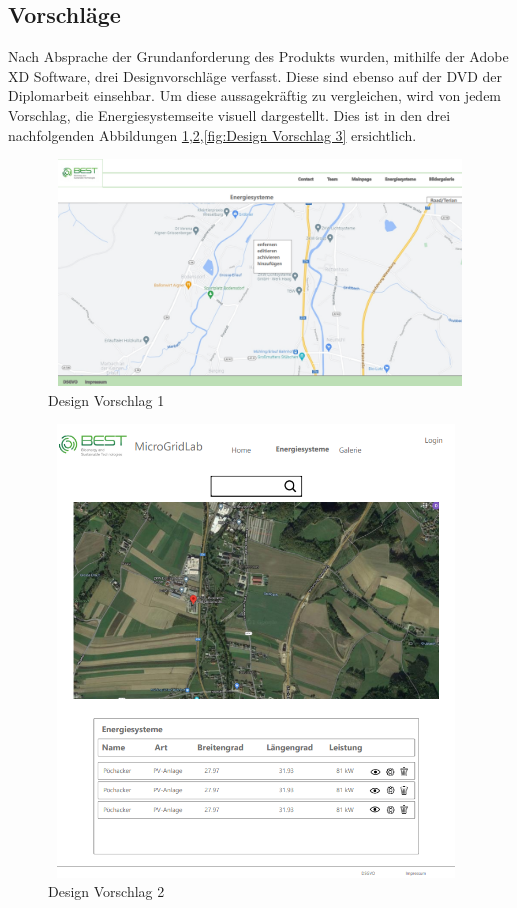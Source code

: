 \subsection{Vorschläge}
Nach Absprache der Grundanforderung des Produkts wurden, mithilfe der Adobe XD Software,  drei Designvorschläge verfasst. Diese sind ebenso auf der DVD der Diplomarbeit einsehbar. Um diese aussagekräftig zu vergleichen, wird von jedem Vorschlag, die Energiesystemseite visuell dargestellt. Dies ist in den drei nachfolgenden Abbildungen \ref{fig:Design Vorschlag 1},\space\ref{fig:Design Vorschlag 2},\space\ref{fig:Design Vorschlag 3} ersichtlich.
\begin{figure}[h]
	\centering
	\includegraphics[height=6cm,width=12cm]{images/DesignVorschlag1}
	\caption{Design Vorschlag 1}
	\label{fig:Design Vorschlag 1}
\end{figure}
\newpage
\begin{figure}[h]
	\centering
	\includegraphics[height=12cm,width=11cm]{images/DesignVorschlag2}
	\caption{Design Vorschlag 2}
	\label{fig:Design Vorschlag 2}
\end{figure}
